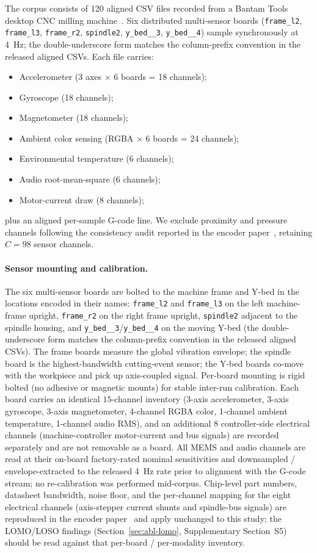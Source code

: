\documentclass[sensors,article,submit,moreauthors,pdftex]{Definitions/mdpi}
\begin{document}
The corpus consists of 120 aligned CSV files recorded from a Bantam Tools desktop CNC milling machine~\cite{encoder_paper}. Six distributed multi-sensor boards (\texttt{frame\_l2}, \texttt{frame\_l3}, \texttt{frame\_r2}, \texttt{spindle2}, \texttt{y\_bed\_\_3}, \texttt{y\_bed\_\_4}) sample synchronously at 4~Hz; the double-underscore form matches the column-prefix convention in the released aligned CSVs. Each file carries:
\begin{itemize}
\item Accelerometer (3 axes $\times$ 6 boards = 18 channels);
\item Gyroscope (18 channels);
\item Magnetometer (18 channels);
\item Ambient color sensing (RGBA $\times$ 6 boards = 24 channels);
\item Environmental temperature (6 channels);
\item Audio root-mean-square (6 channels);
\item Motor-current draw (8 channels);
\end{itemize}
plus an aligned per-sample G-code line. We exclude proximity and pressure channels following the consistency audit reported in the encoder paper~\cite{encoder_paper}, retaining $C=98$ sensor channels.

\paragraph{Sensor mounting and calibration.} The six multi-sensor boards are bolted to the machine frame and Y-bed in the locations encoded in their names: \texttt{frame\_l2} and \texttt{frame\_l3} on the left machine-frame upright, \texttt{frame\_r2} on the right frame upright, \texttt{spindle2} adjacent to the spindle housing, and \texttt{y\_bed\_\_3}/\texttt{y\_bed\_\_4} on the moving Y-bed (the double-underscore form matches the column-prefix convention in the released aligned CSVs). The frame boards measure the global vibration envelope; the spindle board is the highest-bandwidth cutting-event sensor; the Y-bed boards co-move with the workpiece and pick up axis-coupled signal. Per-board mounting is rigid bolted (no adhesive or magnetic mounts) for stable inter-run calibration. Each board carries an identical $15$-channel inventory (3-axis accelerometer, 3-axis gyroscope, 3-axis magnetometer, 4-channel RGBA color, 1-channel ambient temperature, 1-channel audio RMS), and an additional 8 controller-side electrical channels (machine-controller motor-current and bus signals) are recorded separately and are not removable as a board. All MEMS and audio channels are read at their on-board factory-rated nominal sensitivities and downsampled / envelope-extracted to the released 4~Hz rate prior to alignment with the G-code stream; no re-calibration was performed mid-corpus. Chip-level part numbers, datasheet bandwidth, noise floor, and the per-channel mapping for the eight electrical channels (axis-stepper current shunts and spindle-bus signals) are reproduced in the encoder paper~\cite{encoder_paper} and apply unchanged to this study; the LOMO/LOSO findings (Section~\ref{sec:abl-lomo}, Supplementary Section~S5) should be read against that per-board / per-modality inventory.
\end{document}
